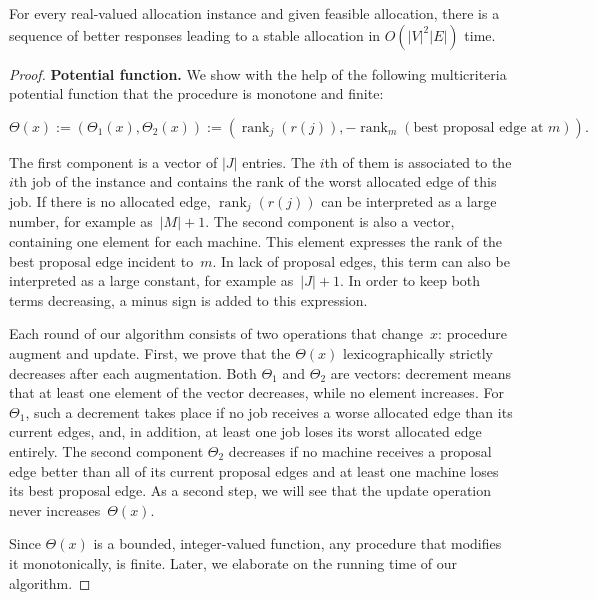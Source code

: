 \documentclass{llncs}
\DeclareMathOperator{\rank}{rank}
\begin{document}
\begin{theorem}
		For every real-valued allocation instance and given feasible allocation, there is a sequence of better responses leading to a stable allocation in $O(|V|^2|E|)$ time.
\end{theorem}

\begin{proof}


\textbf{Potential function. }
We show with the help of the following multicriteria potential function that the procedure is monotone and finite:

$$\Theta(x) := \left(\Theta_1(x),\Theta_2(x)\right) :=  \left(\rank_j(r(j)), - \rank_m(\text{best proposal edge at } m) \right).$$

The first component is a vector of $|J|$ entries. The $i$th of them is associated to the $i$th job of the instance and contains the rank of the worst allocated edge of this job. If there is no allocated edge, $\rank_j(r(j))$ can be interpreted as a large number, for example as~$|M|+1$. The second component is also a vector, containing one element for each machine. This element expresses the rank of the best proposal edge incident to~$m$. In lack of proposal edges, this term can also be interpreted as a large constant, for example as~$|J|+1$. In order to keep both terms decreasing, a minus sign is added to this expression.

Each round of our algorithm consists of two operations that change~$x$: procedure augment and update. First, we prove that the $\Theta(x)$ lexicographically strictly decreases after each augmentation. Both $\Theta_1$ and $\Theta_2$ are vectors: decrement means that at least one element of the vector decreases, while no element increases. For $\Theta_1$, such a decrement takes place if no job receives a worse allocated edge than its current edges, and, in addition, at least one job loses its worst allocated edge entirely. The second component $\Theta_2$ decreases if no machine receives a proposal edge better than all of its current proposal edges and at least one machine loses its best proposal edge. As a second step, we will see that the update operation never increases~$\Theta(x)$.

Since $\Theta(x)$ is a bounded, integer-valued function, any procedure that modifies it monotonically, is finite. Later, we elaborate on the running time of our algorithm.


\end{proof}
\end{document}
